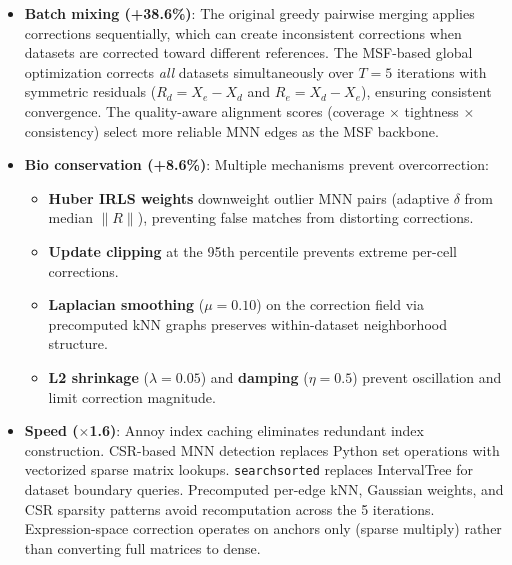 \documentclass[8pt]{article}
\begin{document}
\begin{tcolorbox}[
    title={\textbf{scanorama\_optimized}: Comprehensive improvement via global optimization + robust weighting},
    colback=lightgreen!10, colframe=added!60, fonttitle=\small\bfseries,
    boxrule=0.5pt, arc=2pt, left=6pt, right=6pt, top=3pt, bottom=3pt
]
\small
\begin{itemize}[leftmargin=1em, itemsep=3pt]
    \item \textbf{Batch mixing (+38.6\%)}: The original greedy pairwise merging applies corrections sequentially, which can create inconsistent corrections when datasets are corrected toward different references. The MSF-based global optimization corrects \emph{all} datasets simultaneously over $T{=}5$ iterations with symmetric residuals ($R_d = X_e - X_d$ and $R_e = X_d - X_e$), ensuring consistent convergence. The quality-aware alignment scores (coverage $\times$ tightness $\times$ consistency) select more reliable MNN edges as the MSF backbone.

    \item \textbf{Bio conservation (+8.6\%)}: Multiple mechanisms prevent overcorrection:
    \begin{itemize}[leftmargin=1em, itemsep=1pt]
        \item \textbf{Huber IRLS weights} downweight outlier MNN pairs (adaptive $\delta$ from median $\|R\|$), preventing false matches from distorting corrections.
        \item \textbf{Update clipping} at the 95th percentile prevents extreme per-cell corrections.
        \item \textbf{Laplacian smoothing} ($\mu{=}0.10$) on the correction field via precomputed kNN graphs preserves within-dataset neighborhood structure.
        \item \textbf{L2 shrinkage} ($\lambda{=}0.05$) and \textbf{damping} ($\eta{=}0.5$) prevent oscillation and limit correction magnitude.
    \end{itemize}

    \item \textbf{Speed ($\times$1.6)}: Annoy index caching eliminates redundant index construction. CSR-based MNN detection replaces Python set operations with vectorized sparse matrix lookups. \texttt{searchsorted} replaces IntervalTree for dataset boundary queries. Precomputed per-edge kNN, Gaussian weights, and CSR sparsity patterns avoid recomputation across the 5 iterations. Expression-space correction operates on anchors only (sparse multiply) rather than converting full matrices to dense.
\end{itemize}
\end{tcolorbox}
\end{document}
